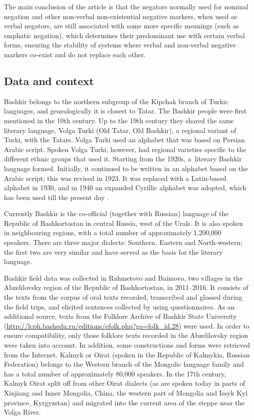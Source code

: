 \documentclass[output=paper,draft,draftmode,colorlinks,citecolor=brown]{langscibook}
\begin{document}
The main conclusion of the article is that the negators normally used for nominal negation and other non-verbal non-existential negative markers, when used as verbal negators, are still associated with some more specific meanings (such as emphatic negation), which determines their predominant use with certain verbal forms, ensuring the stability of systems where verbal and non-verbal negative markers co-exist and do not replace each other.

\subsection{Data and context}\label{sec:BK1.2}

Bashkir belongs to the northern subgroup of the Kipchak branch of Turkic languages, and genealogically it is closest to Tatar. The Bashkir people were first mentioned in the 10th century. Up to the 19th century they shared the same literary language, Volga Turki (Old Tatar, Old Bashkir), a regional variant of Turki, with the Tatars. Volga Turki used an alphabet that was based on Persian Arabic script. Spoken Volga Turki, however, had regional varieties specific to the different ethnic groups that used it. Starting from the 1920s, a literary Bashkir language formed. Initially, it continued to be written in an alphabet based on the Arabic script; this was revised in 1923. It was replaced with a Latin-based alphabet in 1930, and in 1940 an expanded Cyrillic alphabet was adopted, which has been used till the present day \citep[11–12]{yuldashev1981a}.

Currently Bashkir is the co-official (together with Russian) language of the Republic of Bashkortostan in central Russia, west of the Urals. It is also spoken in neighbouring regions, with a total number of approximately 1,200,000 speakers. There are three major dialects: Southern, Eastern and North-western; the first two are very similar and have served as the basis for the literary language.

Bashkir field data was collected in Rahmetovo and Baimovo, two villages in the Abzelilovsky region of the Republic of Bashkortostan, in 2011–2016. It consists of the texts from the corpus of oral texts recorded, transcribed and glossed during the field trips, and elicited sentences collected by using questionnaires. As an additional source, texts from the Folklore Archive of Bashkir State University (\url{http://lcph.bashedu.ru/editions/efolk.php?go=folk_id.28}) were used. In order to ensure compatibility, only those folklore texts recorded in the Abzelilovsky region were taken into account. In addition, some constructions and forms were retrieved from the Internet.
Kalmyk or Oirat (spoken in the Republic of Kalmykia, Russian Federation) belongs to the Western branch of the Mongolic language family and has a total number of approximately 80,000 speakers. In the 17th century, Kalmyk Oirat split off from other Oirat dialects (as are spoken today in parts of Xinjiang and Inner Mongolia, China, the western part of Mongolia and Issyk Kyl province, Kyrgyzstan) and migrated into the current area of the steppe near the Volga River.
\end{document}
